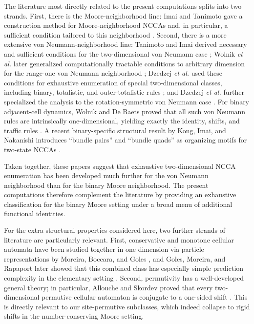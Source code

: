 \documentclass[11pt,a4paper]{article}
\begin{document}
The literature most directly related to the present computations splits into two strands.
First, there is the Moore-neighborhood line: Imai and Tanimoto gave a construction method for
Moore-neighborhood NCCAs and, in particular, a sufficient condition tailored to this neighborhood
\cite{TanimotoImai2008}.  Second, there is a more extensive von Neumann-neighborhood line:
Tanimoto and Imai derived necessary and sufficient conditions for the two-dimensional von Neumann
case \cite{TanimotoImai2009}; Wolnik \emph{et al.} later generalized computationally tractable
conditions to arbitrary dimension for the range-one von Neumann neighborhood
\cite{WolnikDzedzejBaetensDeBaets2017}; Dzedzej \emph{et al.} used these conditions for exhaustive
enumeration of special two-dimensional classes, including binary, totalistic, and outer-totalistic
rules \cite{DzedzejWolnikNencaBaetensDeBaets2020}; and Dzedzej \emph{et al.} further specialized
the analysis to the rotation-symmetric von Neumann case \cite{DzedzejWolnikNencaBaetensDeBaets2021}.
For binary adjacent-cell dynamics, Wolnik and De Baets proved that all such von Neumann rules are
intrinsically one-dimensional, yielding exactly the identity, shifts, and traffic rules
\cite{WolnikDeBaets2019}.  A recent binary-specific structural result by Kong, Imai, and
Nakanishi introduces ``bundle pairs'' and ``bundle quads'' as organizing motifs for two-state
NCCAs \cite{KongImaiNakanishi2021}.

Taken together, these papers suggest that exhaustive two-dimensional NCCA enumeration has been
developed much further for the von Neumann neighborhood than for the binary Moore neighborhood.
The present computations therefore complement the literature by providing an exhaustive
classification for the binary Moore setting under a broad menu of additional functional
identities.

For the extra structural properties considered here, two further strands of literature are
particularly relevant.  First, conservative and monotone cellular automata have been studied
together in one dimension via particle representations by Moreira, Boccara, and Goles
\cite{MoreiraBoccaraGoles2004}, and Goles, Moreira, and Rapaport later showed that this combined
class has especially simple prediction complexity in the elementary setting
\cite{GolesMoreiraRapaport2011}.  Second, permutivity has a well-developed general theory; in
particular, Allouche and Skordev proved that every two-dimensional permutive cellular automaton
is conjugate to a one-sided shift \cite{AlloucheSkordev2003}.  This is directly relevant to our
site-permutive subclasses, which indeed collapse to rigid shifts in the number-conserving Moore
setting.
\end{document}

